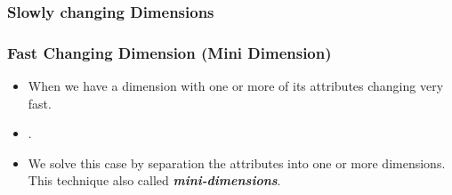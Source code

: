\begin{frame}[fragile]
	\frametitle{Slowly changing Dimensions}
	
	
	
\end{frame}
\begin{frame}
	\frametitle{Fast Changing Dimension (Mini Dimension)}
	\begin{itemize}[<+->]
		\item When we have a dimension with one or more of its attributes changing very fast. 
		
		\item {}.

		\item We solve this case by separation the attributes into one or more dimensions. This technique also called \textit{\textbf{mini-dimensions}}.		
	
	\end{itemize}
\end{frame}
